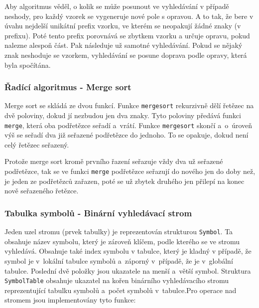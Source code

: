 \documentclass[12pt,a4paper,titlepage,final]{article}
\begin{document}
Aby algoritmus věděl, o kolik se může posunout ve vyhledávání v případě neshody, 
pro každý vzorek se vygeneruje nové pole s opravou. A to tak, že bere v úvahu 
nejdelší unikátní prefix vzorku, ve kterém se neopakují žádné znaky (v prefixu). 
Poté tento prefix porovnává se zbytkem vzorku a určuje opravu, pokud nalezne alespoň část. 
Pak následuje už samotné vyhledávání. Pokud se nějaký znak neshoduje se vzorkem, 
vyhledávání se posune doprava podle opravy, která byla spočítána. 

\subsubsection{Řadící algoritmus - Merge sort}
Merge sort se skládá ze dvou funkcí. Funkce \texttt{mergesort} rekurzivně dělí 
řetězec na dvě poloviny, dokud jí nezbudou jen dva znaky. Tyto poloviny předává funkci
\texttt{merge}, která oba podřetězce seřadí a~vrátí. Funkce \texttt{mergesort} skončí 
a~o~úroveň výš se seřadí dva již seřazené podřetězce do jednoho. To se opakuje, dokud 
není celý řetězec seřazený.

Protože merge sort kromě prvního řazení seřazuje vždy dva už seřazené podřetězce, 
tak se ve funkci \texttt{merge} podřetězce seřazují do nového jen do doby než, 
je jeden ze podřetězců zařazen, poté se už zbytek druhého jen přilepí na konec nově 
seřazeného řetězce.  

\subsubsection{Tabulka symbolů - Binární vyhledávací strom}
Jeden uzel stromu (prvek tabulky) je reprezentován strukturou \texttt{Symbol}.
Ta obsahuje název symbolu, který je zároveň klíčem, podle kterého se ve stromu vyhledává. 
Obsahuje také index symbolu v tabulce, který je kladný v případě, že symbol je 
v~lokální tabulce symbolů a~záporný v~případě, že je v~globální tabulce. Poslední dvě 
položky jsou ukazatele na menší a~větší symbol. Struktura \texttt{SymbolTable} obsahuje 
ukazatel na kořen binárního vyhledávacího stromu reprezentující tabulku symbolů a~počet 
symbolů v~tabulce.\newline\newline Pro operace nad stromem jsou implementovány tyto funkce:
\medskip
\end{document}
